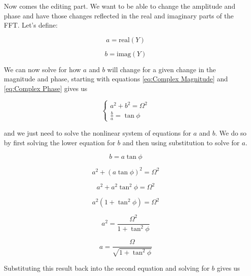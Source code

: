 Now comes the editing part. We want to be able to change the amplitude and phase and have those changes reflected in the real and imaginary parts of the FFT. Let's define:

\begin{equation}
    a = \text{real}(Y)
\end{equation}

\begin{equation}
    b = \text{imag}(Y)
\end{equation}

We can now solve for how $a$ and $b$ will change for a given change in the magnitude and phase, starting with equations \ref{eq:Complex Magnitude} and \ref{eq:Complex Phase} gives us

\begin{equation}
    \begin{cases}
        a^2 + b^2 = \Omega^2 \\
        \frac{b}{a} = \tan{\phi}
    \end{cases}
\end{equation}

and we just need to solve the nonlinear system of equations for $a$ and $b$. We do so by first solving the lower equation for $b$ and then using substitution to solve for $a$.

\begin{equation}
    b = a \tan{\phi}
\end{equation}

\begin{equation}
    a^2 + (a \tan{\phi})^2 = \Omega^2
\end{equation}

\begin{equation}
    a^2 + a^2 \tan^2{\phi} = \Omega^2
\end{equation}

\begin{equation}
    a^2 (1 + \tan^2{\phi}) = \Omega^2
\end{equation}

\begin{equation}
    a^2 = \frac{\Omega^2}{1 + \tan^2{\phi}}
\end{equation}

\begin{equation}
    a = \frac{\Omega}{\sqrt{1 + \tan^2{\phi}}}
\end{equation}

Substituting this result back into the second equation and solving for $b$ gives us

